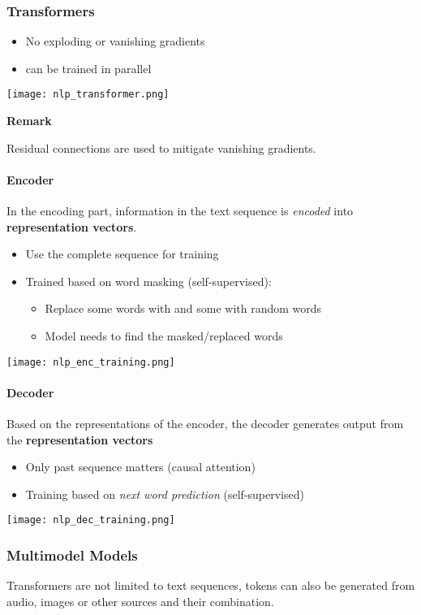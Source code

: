 \subsubsection{Transformers}
\begin{itemize}
    \item No exploding or vanishing gradients
    \item can be trained in parallel
\end{itemize}
\begin{center}
    \texttt{[image: nlp\_transformer.png]}
\end{center}

\textbf{Remark}

Residual connections are used to mitigate vanishing gradients.

\paragraph{Encoder}
In the encoding part, information in the text sequence is \textit{encoded} into \textbf{representation vectors}.
\newpar{}
\begin{itemize}
    \item Use the complete sequence for training
    \item Trained based on word masking (self-supervised):
          \begin{itemize}
              \item Replace some words with  and some with random words
              \item Model needs to find the masked/replaced words
          \end{itemize}
\end{itemize}
\begin{center}
    \texttt{[image: nlp\_enc\_training.png]}
\end{center}


\paragraph{Decoder}

Based on the representations of the encoder, the decoder generates output from the \textbf{representation vectors}
\newpar{}
\begin{itemize}
    \item Only past sequence matters (causal attention)
    \item Training based on \textit{next word prediction} (self-supervised)
\end{itemize}
\begin{center}
    \texttt{[image: nlp\_dec\_training.png]}
\end{center}

\subsubsection{Multimodel Models}
Transformers are not limited to text sequences, tokens can also be generated from audio, images or other sources and their combination.
